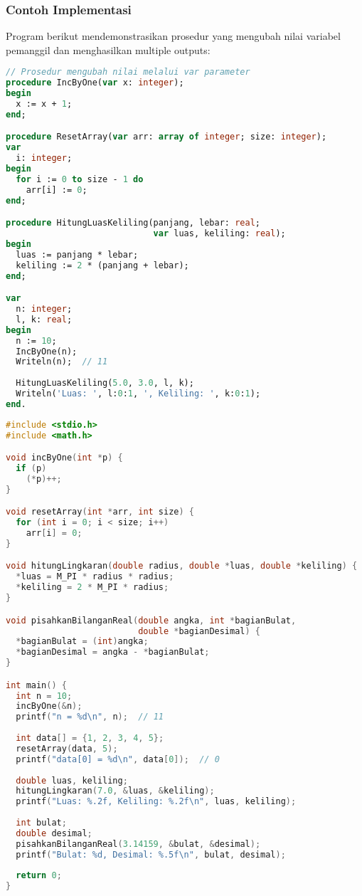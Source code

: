 \documentclass[../main.tex]{subfiles}
\begin{document}
\subsubsection{Contoh Implementasi}

Program berikut mendemonstrasikan prosedur yang mengubah nilai variabel pemanggil dan menghasilkan multiple outputs:

\begin{lstlisting}[language=Pascal, caption={Pass by reference pada prosedur (Pascal)}]
// Prosedur mengubah nilai melalui var parameter
procedure IncByOne(var x: integer);
begin
  x := x + 1;
end;

procedure ResetArray(var arr: array of integer; size: integer);
var
  i: integer;
begin
  for i := 0 to size - 1 do
    arr[i] := 0;
end;

procedure HitungLuasKeliling(panjang, lebar: real; 
                             var luas, keliling: real);
begin
  luas := panjang * lebar;
  keliling := 2 * (panjang + lebar);
end;

var
  n: integer;
  l, k: real;
begin
  n := 10;
  IncByOne(n);
  Writeln(n);  // 11
  
  HitungLuasKeliling(5.0, 3.0, l, k);
  Writeln('Luas: ', l:0:1, ', Keliling: ', k:0:1);
end.
\end{lstlisting}

\begin{lstlisting}[language=C, caption={Pass by reference via pointer (C)}]
#include <stdio.h>
#include <math.h>

void incByOne(int *p) {
  if (p)
    (*p)++;
}

void resetArray(int *arr, int size) {
  for (int i = 0; i < size; i++)
    arr[i] = 0;
}

void hitungLingkaran(double radius, double *luas, double *keliling) {
  *luas = M_PI * radius * radius;
  *keliling = 2 * M_PI * radius;
}

void pisahkanBilanganReal(double angka, int *bagianBulat, 
                          double *bagianDesimal) {
  *bagianBulat = (int)angka;
  *bagianDesimal = angka - *bagianBulat;
}

int main() {
  int n = 10;
  incByOne(&n);
  printf("n = %d\n", n);  // 11
  
  int data[] = {1, 2, 3, 4, 5};
  resetArray(data, 5);
  printf("data[0] = %d\n", data[0]);  // 0
  
  double luas, keliling;
  hitungLingkaran(7.0, &luas, &keliling);
  printf("Luas: %.2f, Keliling: %.2f\n", luas, keliling);
  
  int bulat;
  double desimal;
  pisahkanBilanganReal(3.14159, &bulat, &desimal);
  printf("Bulat: %d, Desimal: %.5f\n", bulat, desimal);
  
  return 0;
}
\end{lstlisting}
\end{document}
